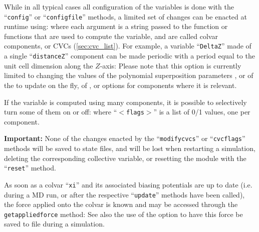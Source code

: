 {While in all typical cases all configuration of the variables is done with the ``\texttt{config}'' or ``\texttt{configfile}'' methods, a limited set of changes can be enacted at runtime using:
\noindent{}where each argument is a string passed to the function or functions that are used to compute the variable, and are called colvar components, or CVCs (\ref{sec:cvc_list}).
For example, a variable ``\texttt{DeltaZ}'' made of a single ``\texttt{distanceZ}'' component can be made periodic with a period equal to the unit cell dimension along the $Z$-axis:
\noindent{}Please note that this option is currently limited to changing the values of the polynomial superposition parameters , or of the  to update on the fly, of ,  or  options for components where it is relevant.

If the variable is computed using many components, it is possible to selectively turn some of them on or off:
\noindent{}where ``\texttt{$<$flags$>$}'' is a list of 0/1 values, one per component.
\ifdefined{}\fi

\textbf{Important:} None of the changes enacted by the ``\texttt{modifycvcs}'' or ``\texttt{cvcflags}'' methods will be saved to state files, and will be lost when restarting a simulation, deleting the corresponding collective variable, or resetting the module with the  ``\texttt{reset}'' method.



As soon as a colvar ``\texttt{xi}'' and its associated biasing potentials are up to date (i.e.{} during a MD run, or after the respective ``\texttt{update}'' methods have been called), the force applied onto the colvar is known and may be accessed through the \texttt{getappliedforce} method:
\noindent{}See also the use of the  option to have this force be saved to file during a simulation.

}
